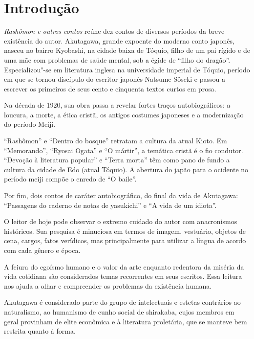 \documentclass[12pt]{extarticle}
\begin{document}
\tableofcontents

\section{Introdução}

\textit{Rashômon e outros contos} reúne dez contos de diversos períodos da
breve existência do autor. Akutagawa, grande expoente do moderno conto japonês,
nasceu no bairro Kyobashi, na cidade baixa de Tóquio, filho de um pai rígido e
de uma mãe com problemas de saúde mental, sob a égide de ``filho do dragão''.
Especializou"-se em literatura inglesa na universidade imperial de Tóquio,
período em que se tornou discípulo do escritor japonês Natsume Sôseki e passou
a escrever os primeiros de seus cento e cinquenta textos curtos em prosa.
 
Na década de 1920, sua obra passa a revelar fortes traços autobiográficos: a
loucura, a morte, a ética cristã, os antigos costumes japoneses e a
modernização do período Meiji. 

``Rashômon'' e ``Dentro do bosque'' retratam a cultura da atual Kioto. Em
``Memorando'', ``Ryosai Ogata'' e ``O mártir'', a temática cristã é o fio condutor.
``Devoção à literatura popular'' e ``Terra morta'' têm como pano de fundo a cultura
da cidade de Edo (atual Tóquio). A abertura do japão para o ocidente no período
meiji compõe o enredo de ``O baile''.
 
Por fim, dois contos de caráter autobiográfico, do final da vida de Akutagawa:
``Passagens do caderno de notas de yasukichi'' e ``A vida de um idiota''.

O leitor de hoje pode observar o extremo cuidado do autor com anacronismos
históricos. Sua pesquisa é minuciosa em termos de imagem, vestuário, objetos de
cena, cargos, fatos verídicos, mas principalmente para utilizar a língua de
acordo com cada gênero e época.

A feiura do egoísmo humano e o valor da arte enquanto redentora da miséria da
vida cotidiana são considerados temas recorrentes em seus escritos.  Essa
leitura nos ajuda a olhar e compreender os problemas da existência humana.
 
Akutagawa é considerado parte do grupo de intelectuais e estetas contrários ao
naturalismo, ao humanismo de cunho social de shirakaba, cujos membros em geral
provinham de elite econômica e à literatura proletária, que se manteve bem
restrita quanto à forma.
 
\end{document}

